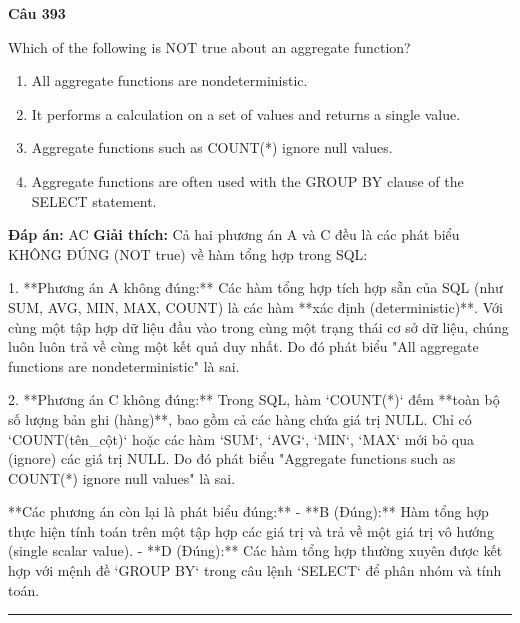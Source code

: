 \documentclass[11pt,a4paper]{article}
\newenvironment{question}[1]{%
  \par\vspace{1em}\noindent\textbf{\large Câu #1}\par\vspace{0.4em}
}{%
  \par\vspace{1em}\hrule\vspace{0.6em}
}
\newenvironment{choices}{%
  \begin{enumerate}[label=\textbf{\Alph*.},leftmargin=2.2em,itemsep=2pt,topsep=3pt]
}{%
  \end{enumerate}
}
\newcommand{\choice}{\item}
\begin{document}
\begin{question}{393}
Which of the following is NOT true about an aggregate function?
\begin{choices}
\choice All aggregate functions are nondeterministic.
\choice It performs a calculation on a set of values and returns a single value.
\choice Aggregate functions such as COUNT(*) ignore null values.
\choice Aggregate functions are often used with the GROUP BY clause of the SELECT statement.
\end{choices}
\textbf{Đáp án:} AC
\textbf{Giải thích:} Cả hai phương án A và C đều là các phát biểu KHÔNG ĐÚNG (NOT true) về hàm tổng hợp trong SQL:

1. **Phương án A không đúng:** Các hàm tổng hợp tích hợp sẵn của SQL (như SUM, AVG, MIN, MAX, COUNT) là các hàm **xác định (deterministic)**. Với cùng một tập hợp dữ liệu đầu vào trong cùng một trạng thái cơ sở dữ liệu, chúng luôn luôn trả về cùng một kết quả duy nhất. Do đó phát biểu "All aggregate functions are nondeterministic" là sai.

2. **Phương án C không đúng:** Trong SQL, hàm `COUNT(*)` đếm **toàn bộ số lượng bản ghi (hàng)**, bao gồm cả các hàng chứa giá trị NULL. Chỉ có `COUNT(tên_cột)` hoặc các hàm `SUM`, `AVG`, `MIN`, `MAX` mới bỏ qua (ignore) các giá trị NULL. Do đó phát biểu "Aggregate functions such as COUNT(*) ignore null values" là sai.

**Các phương án còn lại là phát biểu đúng:**
- **B (Đúng):** Hàm tổng hợp thực hiện tính toán trên một tập hợp các giá trị và trả về một giá trị vô hướng (single scalar value).
- **D (Đúng):** Các hàm tổng hợp thường xuyên được kết hợp với mệnh đề `GROUP BY` trong câu lệnh `SELECT` để phân nhóm và tính toán.
\end{question}
\end{document}
